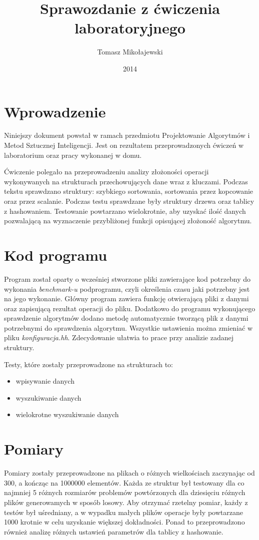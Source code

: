 \documentclass[12pt,a4paper,titlepage]{article}
\title{Sprawozdanie z ćwiczenia laboratoryjnego}
\date{2014}
\author{Tomasz Mikołajewski }
\begin{document}
\maketitle
\pagestyle{empty}
\tableofcontents

\section{Wprowadzenie}
Niniejszy dokument powstał w ramach przedmiotu Projektowanie Algorytmów i Metod Sztucznej Inteligencji. Jest on rezultatem przeprowadzonych ćwiczeń w laboratorium oraz pracy wykonanej w domu.


Ćwiczenie polegało na przeprowadzeniu analizy złożoności operacji wykonywanych na strukturach przechowujących dane wraz z kluczami. Podczas tekstu sprawdzano struktury: szybkiego sortowania, sortowania przez kopcowanie oraz przez scalanie. Podczas testu sprawdzane były struktury drzewa oraz tablicy z hashowaniem. Testowanie powtarzano wielokrotnie, aby uzyskać ilość danych pozwalającą na wyznaczenie przybliżonej funkcji opisującej złożoność algorytmu. 

\section{Kod programu}
Program został oparty o wcześniej stworzone pliki zawierające kod potrzebny do wykonania \textit {benchmark-u} podprogramu, czyli określenia czasu jaki potrzebny jest na jego wykonanie. Główny program zawiera funkcję otwierającą pliki z danymi oraz zapisującą rezultat operacji do pliku. Dodatkowo do programu wykonującego sprawdzenie algorytmów dodano metodę automatycznie tworzącą plik z danymi potrzebnymi do sprawdzenia algorytmu. Wszystkie ustawienia można zmieniać w pliku \textit {konfiguracja.hh}. Zdecydowanie ułatwia to prace przy analizie zadanej struktury.

Testy, które zostały przeprowadzone na strukturach to:
\begin{itemize}
\item wpisywanie danych
\item wyszukiwanie danych
\item wielokrotne wyszukiwanie danych
\end{itemize}


\section{Pomiary}
Pomiary zostały przeprowadzone na plikach o różnych wielkościach zaczynając od 300, a kończąc na 1000000 elementów. Każda ze struktur był testowany dla co najmniej 5 różnych rozmiarów problemów powtórzonych dla dziesięciu różnych plików generowamych w sposób losowy. Aby otrzymać rzetelny pomiar, każdy z testów był uśredniany, a w wypadku małych plików operacje były powtarzane 1000 krotnie w celu uzyskanie większej dokładności. Ponad to przeprowadzono również analizę różnych ustawień parametrów dla tablicy z hashowanie. 
\end{document}
